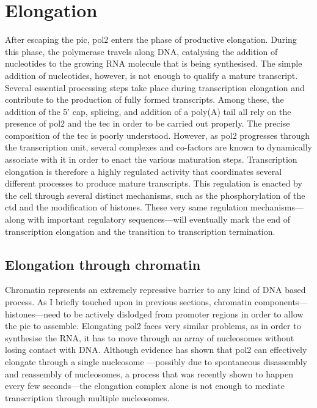 \section{Elongation} %
After escaping the \gls{pic}, \gls{pol2} enters the phase of productive elongation.
During this phase, the polymerase travels along DNA, catalysing the addition of nucleotides to the growing RNA molecule that is being synthesised.
The simple addition of nucleotides, however, is not enough to qualify a mature transcript.
Several essential processing steps take place during transcription elongation and contribute to the production of fully formed transcripts.
Among these, the addition of the 5' cap, splicing, and addition of a poly(A) tail all rely on the presence of \gls{pol2} and the \gls{tec} in order to be carried out properly.
The precise composition of the \gls{tec} is poorly understood. 
However, as \gls{pol2} progresses through the transcription unit, several complexes and co-factors are known to dynamically associate with it in order to enact the various maturation steps.  
Transcription elongation is therefore a highly regulated activity that coordinates several different processes to produce mature transcripts.
This regulation is enacted by the cell through several distinct mechanisms, such as the phosphorylation of the \gls{ctd} and the modification of histones.
These very same regulation mechanisms---along with important regulatory sequences---will eventually mark the end of transcription elongation and the transition to transcription termination.

\subsection{Elongation through chromatin}
Chromatin represents an extremely repressive barrier to any kind of DNA based process.
As I briefly touched upon in previous sections, chromatin components---histones---need to be actively dislodged from promoter regions in order to allow the \acrlong{pic} to assemble.
Elongating \gls{pol2} faces very similar problems, as in order to synthesise the RNA, it has to move through an array of nucleosomes without losing contact with DNA.
Although \invitro{} evidence has shown that \gls{pol2} can effectively elongate through a single nucleosome \citep{lorch:1987:nucleosomes}---possibly due to spontaneous disassembly and reassembly of nucleosomes, a process that was recently shown to happen every few seconds\citep{kim:2016:singlemolecule}---the elongation complex alone is not enough to mediate transcription through multiple nucleosomes.

